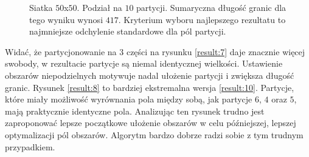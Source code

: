 \begin{figure}[h]
\begin{subfigure}{.33\textwidth}
    \caption[short]{}
\end{subfigure}
\caption{Siatka $50$x$50$. Podział na $10$ partycji. Sumaryczna długość granic dla tego wyniku wynosi $417$.
Kryterium wyboru najlepszego rezultatu to najmniejsze odchylenie standardowe dla pól partycji.}
\label{result:9}
\end{figure}

Widać, że partycjonowanie na $3$ części na rysunku \ref{result:7} daje znacznie więcej swobody, w rezultacie
partycje są niemal identycznej wielkości.
Ustawienie obszarów niepodzielnych motywuje nadal ułożenie partycji i zwiększa długość granic.
Rysunek \ref{result:8} to bardziej ekstremalna wersja \ref{result:10}.
Partycje, które miały możliwość wyrównania pola między sobą, jak partycje $6$, $4$ oraz $5$,
mają praktycznie identyczne pola.
Analizując ten rysunek trudno jest zaproponować lepsze początkowe ułożenie obszarów w celu późniejszej, lepszej optymalizacji
pól obszarów.
Algorytm bardzo dobrze radzi sobie z tym trudnym przypadkiem.

\vspace{4mm}

